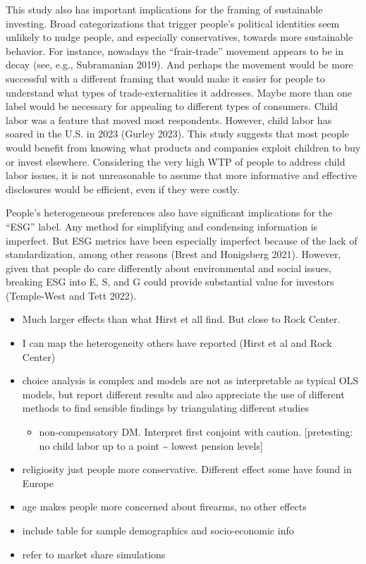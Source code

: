\documentclass[
  12pt,
]{article}
\providecommand{\tightlist}{%
  \setlength{\itemsep}{0pt}\setlength{\parskip}{0pt}}
\begin{document}
This study also has important implications for the framing of sustainable investing. Broad categorizations that trigger people's political identities seem unlikely to nudge people, and especially conservatives, towards more sustainable behavior. For instance, nowadays the ``frair-trade'' movement appears to be in decay (see, e.g., Subramanian 2019). And perhaps the movement would be more successful with a different framing that would make it easier for people to understand what types of trade-externalities it addresses. Maybe more than one label would be necessary for appealing to different types of consumers. Child labor was a feature that moved most respondents. However, child labor has soared in the U.S. in 2023 (Gurley 2023). This study suggests that most people would benefit from knowing what products and companies exploit children to buy or invest elsewhere. Considering the very high WTP of people to address child labor issues, it is not unreasonable to assume that more informative and effective disclosures would be efficient, even if they were costly.

People's heterogeneous preferences also have significant implications for the ``ESG'' label. Any method for simplifying and condensing information is imperfect. But ESG metrics have been especially imperfect because of the lack of standardization, among other reasons (Brest and Honigsberg 2021). However, given that people do care differently about environmental and social issues, breaking ESG into E, S, and G could provide substantial value for investors (Temple-West and Tett 2022).

\begin{itemize}
\item
  Much larger effects than what Hirst et all find. But close to Rock Center.
\item
  I can map the heterogeneity others have reported (Hirst et al and Rock Center)
\item
  choice analysis is complex and models are not as interpretable as typical OLS models, but report different results and also appreciate the use of different methods to find sensible findings by triangulating different studies

  \begin{itemize}
  \tightlist
  \item
    non-compensatory DM. Interpret first conjoint with caution. {[}pretesting: no child labor up to a point \textasciitilde{} lowest pension levels{]}
  \end{itemize}
\item
  religiosity just people more conservative. Different effect some have found in Europe
\item
  age makes people more concerned about firearms, no other effects
\item
  include table for sample demographics and socio-economic info
\item
  refer to market share simulations
\end{itemize}
\end{document}
